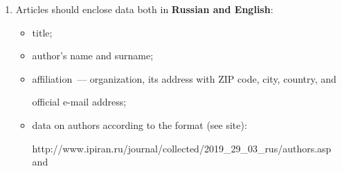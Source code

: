 {{\begin{enumerate}[1.]
abstract. The full term for which an abbreviation stands should precede


its first use in the text unless it is a standard unit of measurement.





All pages of the manuscript should be numbered.





The templates for the manuscript typesetting are presented on site:





{\sf


http://www.ipiran.ru/journal/template\_iiep\_ssi\_2024.zip}\\[-14pt]





\def\rightkol{Requirements for manuscripts submitted to~Journal}


\def\leftkol{Requirements for manuscripts submitted to~Journal}










\item Articles should enclose data both in \textbf{Russian and English}:\\[-16pt]


\begin{itemize}


\item title;\\[-13.5pt]


\item author's name and surname;\\[-13.5pt]


\item affiliation~--- organization, its address with ZIP code, city, country, and


official e-mail address;\\[-13.5pt]


\item data on authors according to the format (see site):





{\sf http://www.ipiran.ru/journal/collected/2019\_29\_03\_rus/authors.asp}  and






\end{itemize}
\end{enumerate}}}

